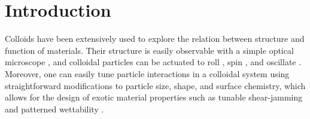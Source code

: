 \documentclass[12pt]{article}
\begin{document}

\section*{Introduction}
Colloids have been extensively used to explore the relation between structure and function of materials. Their structure is easily observable with a simple optical microscope \cite{li_colloidal_2011,zhang_toward_2015,manoharan_colloidal_2015}, and colloidal particles can be actuated to roll \cite{driscoll_unstable_2017}, spin \cite{sabrina_shape-directed_2018}, and oscillate \cite{zhang_quincke_2021}.
Moreover, one can easily tune particle interactions in a colloidal system using straightforward modifications to particle size, shape, and surface chemistry, which allows for the design of exotic material properties such as tunable shear-jamming \cite{chen_leveraging_2023} and patterned wettability \cite{shao_superwettable_2019}.
\end{document}
